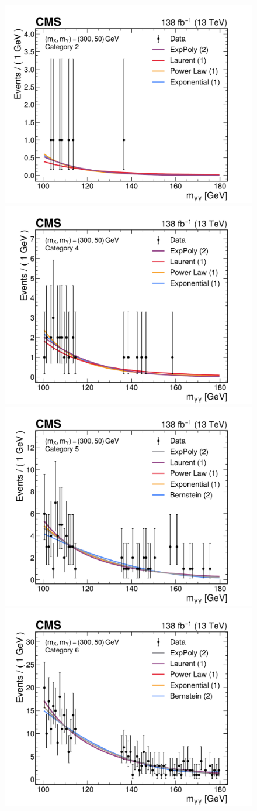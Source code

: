 \begin{figure}
  \centering
  \includegraphics[width=.49\linewidth]{Figures/Dihiggs/background/envelope/y_tautau/bkgmodel_pdfs_ggttresmx300my50cat2.pdf}
  \includegraphics[width=.49\linewidth]{Figures/Dihiggs/background/envelope/y_tautau/bkgmodel_pdfs_ggttresmx300my50cat4.pdf}
  \includegraphics[width=.49\linewidth]{Figures/Dihiggs/background/envelope/y_tautau/bkgmodel_pdfs_ggttresmx300my50cat5.pdf}
  \includegraphics[width=.49\linewidth]{Figures/Dihiggs/background/envelope/y_tautau/bkgmodel_pdfs_ggttresmx300my50cat6.pdf}

\end{figure}
